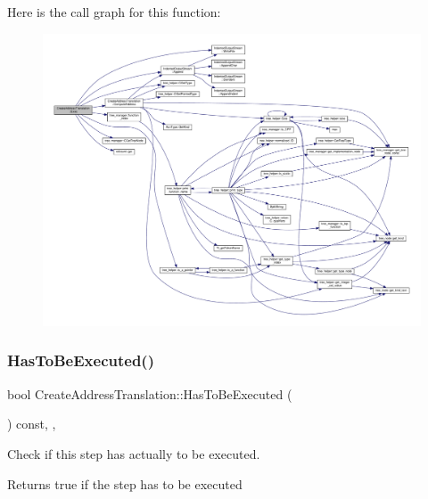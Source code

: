 Here is the call graph for this function\+:
\nopagebreak
\begin{figure}[H]
\begin{center}
\leavevmode
\includegraphics[width=350pt]{d1/d40/classCreateAddressTranslation_a1213d1228ac3e336e8425ebacdf1ab60_cgraph}
\end{center}
\end{figure}
\mbox{\label{classCreateAddressTranslation_a3570b8c94b6ff002652bffa0353cb977}} 
\subsubsection{\texorpdfstring{Has\+To\+Be\+Executed()}{HasToBeExecuted()}}
{\footnotesize\ttfamily bool Create\+Address\+Translation\+::\+Has\+To\+Be\+Executed (\begin{DoxyParamCaption}{ }\end{DoxyParamCaption}) const\hspace{0.3cm}{\ttfamily [override]}, {\ttfamily [protected]}, {\ttfamily [virtual]}}



Check if this step has actually to be executed. 

\begin{DoxyReturn}{Returns}
true if the step has to be executed 
\end{DoxyReturn}


